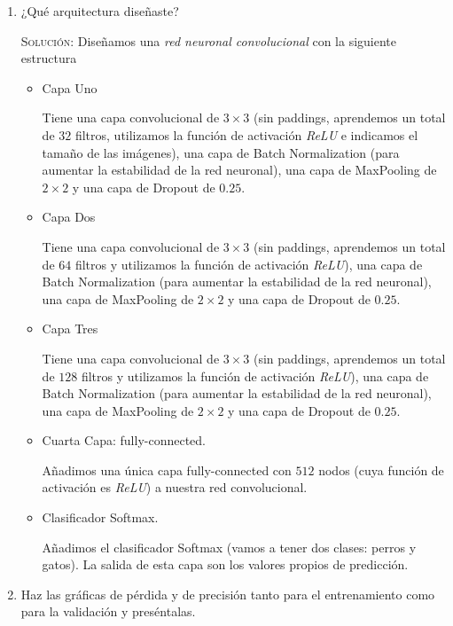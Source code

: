 \documentclass[letterpaper,11pt]{article}
\begin{document}
\begin{enumerate}
    \item ¿Qué arquitectura diseñaste?
    
    \textsc{Solución:} Diseñamos una \textit{red neuronal convolucional} con 
    la siguiente estructura
    \begin{itemize}
        \item Capa Uno

        Tiene una capa convolucional de $3 \times 3$ (sin paddings, aprendemos
        un total de $32$ filtros, utilizamos la función de activación 
        \textit{ReLU} e indicamos el tamaño de las imágenes), una capa de Batch 
        Normalization (para aumentar la estabilidad de la red neuronal), una 
        capa de MaxPooling de $2 \times 2$ y una capa de Dropout de $0.25$.  

        \item Capa Dos

        Tiene una capa convolucional de $3 \times 3$ (sin paddings, aprendemos 
        un total de $64$ filtros y utilizamos la función de activación 
        \textit{ReLU}), una capa de Batch Normalization (para aumentar la 
        estabilidad de la red neuronal), una capa de MaxPooling de $2 \times 2$
        y una capa de Dropout de $0.25$. 

        \item Capa Tres
        
        Tiene una capa convolucional de $3 \times 3$ (sin paddings, aprendemos 
        un total de $128$ filtros y utilizamos la función de activación 
        \textit{ReLU}), una capa de Batch Normalization (para aumentar la 
        estabilidad de la red neuronal), una capa de MaxPooling de $2 \times 2$
        y una capa de Dropout de $0.25$.

        \item Cuarta Capa: fully-connected. 
        
        Añadimos una única capa fully-connected con $512$ nodos (cuya función de 
        activación es \textit{ReLU}) a nuestra red convolucional. 

        \item Clasificador Softmax.

        Añadimos el clasificador Softmax (vamos a tener dos clases: perros y 
        gatos). La salida de esta capa son los valores propios de predicción. 
    \end{itemize}

    \item Haz las gráficas de pérdida y de precisión tanto para el entrenamiento
    como para la validación y preséntalas.


\end{enumerate}
\end{document}
